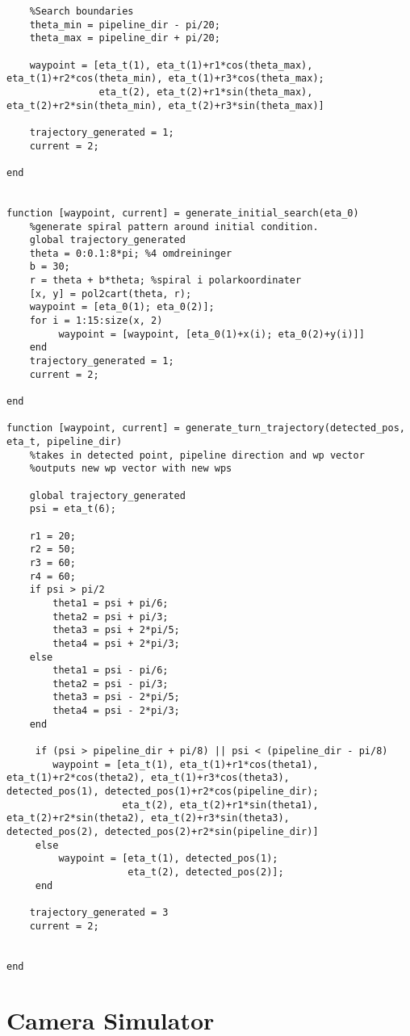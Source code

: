 \begin{lstlisting}
    %Search boundaries
    theta_min = pipeline_dir - pi/20;
    theta_max = pipeline_dir + pi/20;
    
    waypoint = [eta_t(1), eta_t(1)+r1*cos(theta_max), eta_t(1)+r2*cos(theta_min), eta_t(1)+r3*cos(theta_max);
                eta_t(2), eta_t(2)+r1*sin(theta_max), eta_t(2)+r2*sin(theta_min), eta_t(2)+r3*sin(theta_max)]
    
    trajectory_generated = 1;
    current = 2;
    
end


function [waypoint, current] = generate_initial_search(eta_0)
    %generate spiral pattern around initial condition.
    global trajectory_generated
    theta = 0:0.1:8*pi; %4 omdreininger
    b = 30;
    r = theta + b*theta; %spiral i polarkoordinater
    [x, y] = pol2cart(theta, r);
    waypoint = [eta_0(1); eta_0(2)];
    for i = 1:15:size(x, 2)
         waypoint = [waypoint, [eta_0(1)+x(i); eta_0(2)+y(i)]]
    end
    trajectory_generated = 1;
    current = 2;
    
end

function [waypoint, current] = generate_turn_trajectory(detected_pos, eta_t, pipeline_dir)
    %takes in detected point, pipeline direction and wp vector
    %outputs new wp vector with new wps
    
    global trajectory_generated
    psi = eta_t(6);
    
    r1 = 20;
    r2 = 50;
    r3 = 60;
    r4 = 60;
    if psi > pi/2
        theta1 = psi + pi/6;
        theta2 = psi + pi/3;
        theta3 = psi + 2*pi/5;
        theta4 = psi + 2*pi/3;
    else
        theta1 = psi - pi/6;
        theta2 = psi - pi/3;
        theta3 = psi - 2*pi/5;
        theta4 = psi - 2*pi/3;
    end
    
     if (psi > pipeline_dir + pi/8) || psi < (pipeline_dir - pi/8)
        waypoint = [eta_t(1), eta_t(1)+r1*cos(theta1), eta_t(1)+r2*cos(theta2), eta_t(1)+r3*cos(theta3),
detected_pos(1), detected_pos(1)+r2*cos(pipeline_dir);
                    eta_t(2), eta_t(2)+r1*sin(theta1), eta_t(2)+r2*sin(theta2), eta_t(2)+r3*sin(theta3),
detected_pos(2), detected_pos(2)+r2*sin(pipeline_dir)]
     else
         waypoint = [eta_t(1), detected_pos(1);
                     eta_t(2), detected_pos(2)];
     end
    
    trajectory_generated = 3
    current = 2;
    
    
end
\end{lstlisting}

\section{Camera Simulator}


